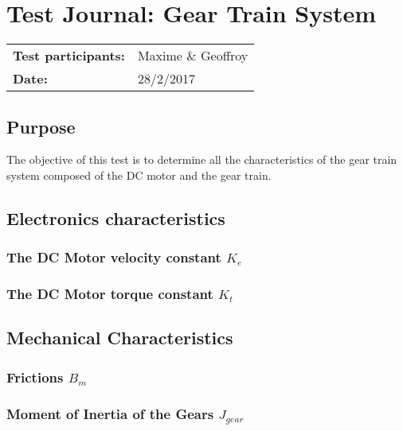 \graphicspath{{figures/appendix/"Motor&GearTests"/}}
\chapter{Test Journal: Gear Train System}\label{appendix:DCMotorInductance}
\begin{table}[htbp]
\begin{tabular}{l l}
\textbf{Test participants:} & Maxime \& Geoffroy  \\
\textbf{Date:}  & 28/2/2017
\end{tabular}
\end{table}

\section*{Purpose}
The objective of this test is to determine all the characteristics of the gear train system composed of the DC motor and the gear train.
\section{Electronics characteristics}



\subsection{The DC Motor velocity constant $K_e$}\label{sec:MeasKe}


\subsection{The DC Motor torque constant $K_t$}\label{sec:MeasKt}


\newpage
\section{Mechanical Characteristics}

\subsection{Frictions $B_m$}\label{sec:MeasBm}


\subsection{Moment of Inertia of the Gears $J_{gear}$}\label{sec:MeasJg}




